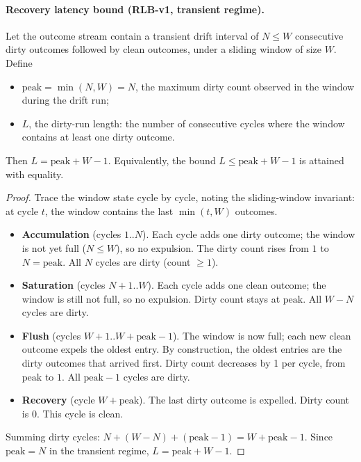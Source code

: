 \documentclass[11pt,a4paper]{article}
\begin{document}
\paragraph{Recovery latency bound (RLB-v1, transient regime).}
Let the outcome stream contain a transient drift interval of
$N \le W$ consecutive dirty outcomes followed by clean outcomes,
under a sliding window of size $W$. Define
\begin{itemize}[noitemsep,topsep=2pt]
\item $\mathrm{peak} = \min(N, W) = N$, the maximum dirty count
      observed in the window during the drift run;
\item $L$, the dirty-run length: the number of consecutive cycles
      where the window contains at least one dirty outcome.
\end{itemize}
Then $L = \mathrm{peak} + W - 1$. Equivalently, the bound
$L \le \mathrm{peak} + W - 1$ is attained with equality.

\begin{proof}
Trace the window state cycle by cycle, noting the sliding-window
invariant: at cycle $t$, the window contains the last
$\min(t, W)$ outcomes.
\begin{itemize}
  \item \textbf{Accumulation} (cycles $1..N$). Each cycle adds one
        dirty outcome; the window is not yet full ($N \le W$), so
        no expulsion. The dirty count rises from $1$ to
        $N = \mathrm{peak}$. All $N$ cycles are dirty (count $\ge 1$).
  \item \textbf{Saturation} (cycles $N+1..W$). Each cycle adds one
        clean outcome; the window is still not full, so no
        expulsion. Dirty count stays at $\mathrm{peak}$. All
        $W - N$ cycles are dirty.
  \item \textbf{Flush} (cycles $W+1..W+\mathrm{peak}-1$). The
        window is now full; each new clean outcome expels the
        oldest entry. By construction, the oldest entries are the
        dirty outcomes that arrived first. Dirty count decreases
        by 1 per cycle, from $\mathrm{peak}$ to $1$. All
        $\mathrm{peak} - 1$ cycles are dirty.
  \item \textbf{Recovery} (cycle $W+\mathrm{peak}$). The last
        dirty outcome is expelled. Dirty count is $0$. This cycle
        is clean.
\end{itemize}
Summing dirty cycles: $N + (W - N) + (\mathrm{peak} - 1) = W + \mathrm{peak} - 1$.
Since $\mathrm{peak} = N$ in the transient regime,
$L = \mathrm{peak} + W - 1$. \qedhere
\end{proof}
\end{document}
